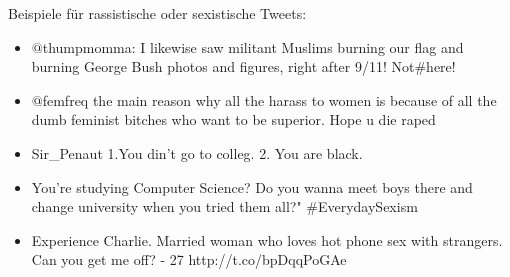 Beispiele f{\"u}r rassistische oder sexistische Tweets:
\begin{itemize}
  \item $@$thumpmomma: I likewise saw militant Muslims burning our flag and burning George Bush photos and figures, right after 9/11! Not\#here!
  \item $@$femfreq the main reason why all the harass to women is because of all the dumb feminist bitches who want to be superior. Hope u die raped
  \item Sir\_Penaut 1.You din't go to colleg. 2. You are black.
  \item You're studying Computer Science? Do you wanna meet boys there and change university when you tried them all?" \#EverydaySexism
  \item Experience Charlie. Married woman who loves hot phone sex with strangers. Can you get me off? - 27 http://t.co/bpDqqPoGAe
\end{itemize}
                                                                                                                                                                                                                                                                                                                                                                                                                                                                                                                                                                                                                                                                                                                                                                                                                                                                                                                                                                                                                                                                                                                                                                                                                                                                                                                                                                                                                                                                                                                                                                                                                                                                                                                                                                                                                                                                                                                                                                       
